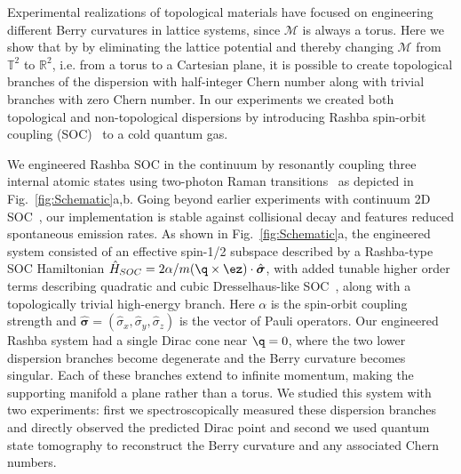 Experimental realizations of topological materials have focused on engineering different Berry curvatures in lattice systems, since $\mathcal{M}$ is always a torus. Here we show that by by eliminating the lattice potential and thereby changing  $\mathcal{M}$ from ${\mathbb T}^2$ to ${\mathbb R}^2$, i.e. from a torus to a Cartesian plane, it is possible to create topological branches of the dispersion with half-integer Chern number along with trivial branches with zero Chern number. In our experiments we created both topological and non-topological dispersions by introducing Rashba spin-orbit coupling (SOC)~\cite{campbell_realistic_2011} to a cold quantum gas.

 We engineered Rashba SOC in the continuum by resonantly coupling three internal atomic states using two-photon Raman transitions~\cite{campbell_rashba_2016} as depicted in Fig.~\ref{fig:Schematic}a,b. Going beyond earlier experiments with continuum 2D SOC~\cite{noauthor_experimental_nodate,meng_experimental_2016}, our implementation is stable against collisional decay and features reduced spontaneous emission rates. As shown in Fig.~\ref{fig:Schematic}a, the engineered system consisted of an effective spin-1/2 subspace described by a Rashba-type SOC Hamiltonian $\hat{H}_{SOC}=2\alpha/m(\q \times \ez) \cdot \hat{\boldsymbol{\sigma}}$, with added tunable higher order terms describing quadratic and cubic Dresselhaus-like SOC~\cite{campbell_realistic_2011}, along with a topologically trivial high-energy branch. Here $\alpha$ is the spin-orbit coupling strength and $\hat{\boldsymbol{\sigma}}=(\hat{\sigma}_x,\hat{\sigma}_y,\hat{\sigma}_z)$ is the vector of Pauli operators. Our engineered Rashba system had a single Dirac cone near $\q=0$, where the two lower dispersion branches become degenerate and the Berry curvature becomes singular. Each of these branches extend to infinite momentum, making the supporting manifold a plane rather than a torus.  We studied this system with two experiments: first we spectroscopically measured these dispersion branches and directly observed the predicted Dirac point and second we used quantum state tomography to reconstruct the Berry curvature and any associated Chern numbers.

%
%
%

